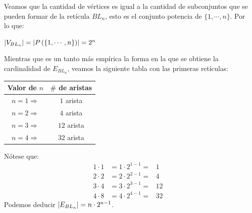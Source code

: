 \documentclass{article}
\begin{document}
\begin{enumerate}
\begin{enumerate}
        Veamos que la cantidad de vértices es igual a la
        cantidad de subconjuntos que se pueden formar de
        la retícula $BL_n$, esto es el conjunto potencia
        de $\{1, \dotsm, n\}$. Por lo que:
        \begin{center}
          $\abs{V_{BL_n}} = \abs{P \left(\{1, \dotsm, n\}\right)} = 2^{n}$
        \end{center}
        Mientras que es un tanto más empírica la forma en
        la que se obtiene la cardinalidad de $E_{BL_n}$,
        veamos la siguiente tabla con las primeras retículas:
        \begin{center}
          \begin{tabular}{|c|c|}
            \hline
            Valor de $n$ & $\#$ de aristas \\
            \hline
            $n = 1 \Rightarrow$ & $1$ arista \\
            \hline
            $n = 2 \Rightarrow$ & $4$ arista \\
            \hline
            $n = 3 \Rightarrow$ & $12$ arista \\
            \hline
            $n = 4 \Rightarrow$ & $32$ arista \\
            \hline
          \end{tabular}
        \end{center}
        Nótese que:
        \begin{eqnarray*}
          1 \cdot 1 &= 1 \cdot 2^{1-1} =& 1\\
          2 \cdot 2 &= 2 \cdot 2^{2-1} =& 4\\
          3 \cdot 4 &= 3 \cdot 2^{3-1} =& 12\\
          4 \cdot 8 &= 4 \cdot 2^{4-1} =& 32
        \end{eqnarray*}
        Podemos deducir $\abs{E_{BL_n}} = n \cdot 2^{n-1}$.

        \begin{center}
        \end{center}


\end{enumerate}
\end{enumerate}
\end{document}
